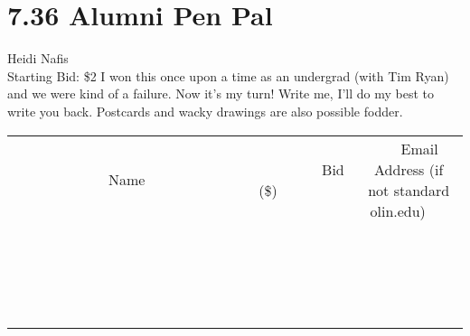 \documentclass[11pt]{article}
\begin{document}
\section*{7.36 Alumni Pen Pal}
Heidi Nafis
\\
Starting Bid: \$2
\newline
I won this once upon a time as an undergrad (with Tim Ryan) and we were kind of a failure. Now it's my turn! Write me, I'll do my best to write you back. Postcards and wacky drawings are also possible fodder.
\\[3ex]
\begin{tabular}{c c c}
~~~~~~~~~~~~~Name~~~~~~~~~~~~~ & ~~~~~~~~~Bid (\$)~~~~~~~~~  & ~~~Email Address (if not standard olin.edu)~~~\\
 & & \\
\hline
 & & \\
\hline
 & & \\
\hline
 & & \\
\hline
 & & \\
\hline
 & & \\
\hline
 & & \\
\hline
 & & \\
\hline
 & & \\
\hline
 & & \\
\hline
 & & \\
\hline
 & & \\
\hline
 & & \\
\hline
 & & \\
\hline
 & & \\
\hline
 & & \\
\hline
 & & \\
\hline
 & & \\
\hline
 & & \\
\hline
\end{tabular}
\newpage
\end{document}
